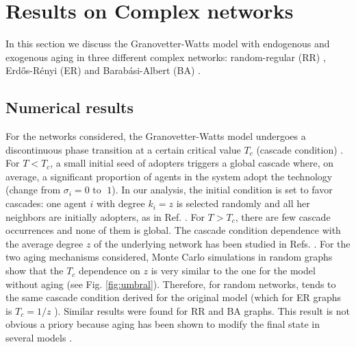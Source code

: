 \section{\label{sec:Complex networks} Results  on Complex networks}

In this section we discuss the Granovetter-Watts model with endogenous and exogenous aging in three different complex networks: random-regular (RR) \cite{wormald1999models}, Erd\H{o}s-R\'enyi (ER) \cite{erdos1960evolution} and Barab\'asi-Albert (BA) \cite{barabasi2009scale}.

\subsection{\label{subsec:Numerical results} Numerical results}

For the networks considered, the Granovetter-Watts model undergoes a discontinuous phase transition at a certain critical value $T_{c}$ (cascade condition) \cite{watts-2002}. For $T<T_c$, a small initial seed of adopters triggers a global cascade where, on average, a significant proportion of agents in the system adopt the technology (change from $\sigma_i = 0 \mbox{ to } \; 1$). In our analysis, the initial condition is set to favor cascades: one agent $i$ with degree $k_i = z$ is selected randomly and all her neighbors are initially adopters, as in Ref. \cite{centola-2007,singh-2013}. For $T>T_c$, there are few cascade occurrences and none of them is global. The cascade condition dependence with the average degree $z$ of the underlying network has been studied in Refs. \cite{watts-2002, gleeson-2007}. For the two aging mechanisms considered, Monte Carlo simulations in random graphs show that the $T_c$ dependence on $z$ is very similar to the one for the model without aging (see Fig. \ref{fig:umbral}). Therefore, for random networks, tends to the same cascade condition derived for the original model (which for ER graphs is $T_{c} = 1 / z$ \cite{watts-2002}). Similar results were found for RR and BA graphs. This result is not obvious a priory because aging has been shown to modify the final state in several models \cite{fernandez-gracia-2013,artime-2018,peralta-2020C,peralta-2020A,chen-2020,fernandez-gracia-2011,perez-2016,stark-2008}. 

